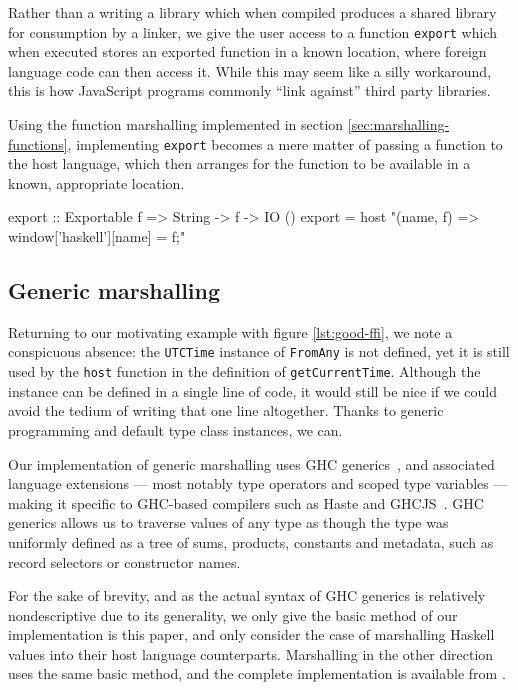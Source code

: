 \documentclass[preprint]{sigplanconf}
\begin{document}
Rather than a writing a library which when compiled produces a shared library
for consumption by a linker, we give the user access to a function
\lstinline!export! which when executed stores an exported function in a
known location, where foreign language code can then access it.
While this may seem like a silly workaround, this is how JavaScript programs
commonly ``link against'' third party libraries.

Using the function marshalling implemented in section
\ref{sec:marshalling-functions}, implementing \lstinline!export! becomes a
mere matter of passing a function to the host language, which then
arranges for the function to be available in a known, appropriate location.

\begin{code}
  export :: Exportable f => String -> f -> IO ()
  export =
    host "(name, f) => window['haskell'][name] = f;"
\end{code}

\subsection{Generic marshalling}
\label{sec:default-instances}
Returning to our motivating example with figure \ref{lst:good-ffi}, we note
a conspicuous absence: the \lstinline!UTCTime! instance of \lstinline!FromAny!
is not defined, yet it is still used by the \lstinline!host! function in the
definition of \lstinline!getCurrentTime!. Although the instance can be defined
in a single line of code, it would still be nice if we could avoid the tedium
of writing that one line altogether. Thanks to generic programming and default
type class instances, we can.

Our implementation of generic marshalling uses GHC generics\ \cite{generics},
and associated language extensions --- most notably type operators and scoped
type variables --- making it specific to GHC-based compilers such as Haste and
GHCJS\ \cite{ghcjs}. GHC generics allows us to traverse values of any type
as though the type was uniformly defined as a tree of sums, products,
constants and metadata, such as record selectors or constructor names.

For the sake of brevity, and as the actual syntax of GHC generics is
relatively nondescriptive due to its generality, we only give the basic method
of our implementation is this paper, and only consider the case of marshalling
Haskell values into their host language counterparts.
Marshalling in the other direction uses the same basic method,
and the complete implementation is available from \cite{haste-lang.org}.
\end{document}
